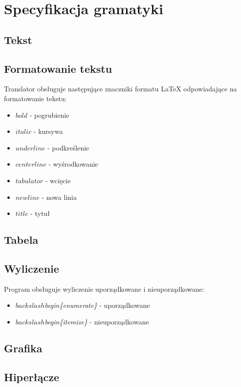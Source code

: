 \chapter{Specyfikacja gramatyki}

\section{Tekst}

\section{Formatowanie tekstu}

Translator obsługuje następujące znaczniki formatu LaTeX odpowiadające na formatowanie tekstu:
\begin{itemize}
    \item \textit{$bold$} - pogrubienie
    \item \textit{$italic$} - kursywa
    \item \textit{$underline$} - podkreślenie
    \item \textit{$centerline$} - wyśrodkowanie
    \item \textit{$tabulator$} - wcięcie
    \item \textit{$newline$} - nowa linia
    \item \textit{$title$} - tytuł
\end{itemize}

\section{Tabela}

\section{Wyliczenie}

Program obsługuje wyliczenie uporządkowane i nieuporządkowane:
\begin{itemize}
    \item \textit{$backslash$begin\{enumerate\}} - uporządkowane
    \item \textit{$backslash$begin\{itemize\}} - nieuporządkowane
\end{itemize}

\section{Grafika}

\section{Hiperłącze}

